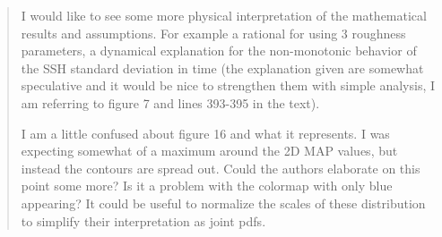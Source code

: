 \documentclass[]{article}
\begin{document}
\begin{quote}
I would like to see some more physical interpretation of the mathematical results and assumptions. For example a rational for using 3 roughness parameters, a dynamical explanation for the non-monotonic behavior of the SSH standard deviation in time (the explanation given are somewhat speculative and it would be nice to strengthen them with simple analysis, I am referring to figure 7 and lines 393-395 in the text).

I am a little confused about figure 16 and what it represents. I was expecting somewhat of a maximum around the 2D MAP values, but instead the contours are spread out. Could the authors elaborate on this point some more? Is it a problem with the colormap with only blue appearing? It could be useful to normalize the scales of these distribution to simplify their interpretation as joint pdfs.
\end{quote}
\end{document}
